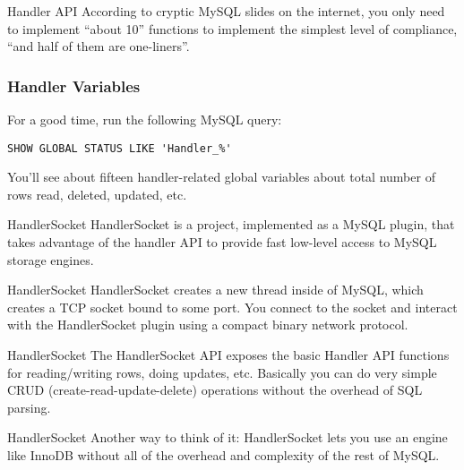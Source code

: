 \documentclass[14pt]{beamer}
\begin{document}
\begin{frame}{Handler API}
  According to cryptic MySQL slides on the internet, you only need to implement
  ``about 10'' functions to implement the simplest level of compliance, ``and
  half of them are one-liners''.
\end{frame}

\begin{frame}[fragile]
  \frametitle{Handler Variables}
  For a good time, run the following MySQL query:
\begin{verbatim}
SHOW GLOBAL STATUS LIKE 'Handler_%'
\end{verbatim}
  You'll see about fifteen handler-related global variables about total number
  of rows read, deleted, updated, etc.
\end{frame}

\begin{frame}{HandlerSocket}
  HandlerSocket is a project, implemented as a MySQL plugin, that takes
  advantage of the handler API to provide fast low-level access to MySQL storage
  engines.
\end{frame}

\begin{frame}{HandlerSocket}
  HandlerSocket creates a new thread inside of MySQL, which creates a TCP socket
  bound to some port.
  \newline
  \newline
  You connect to the socket and interact with the HandlerSocket plugin using a
  compact binary network protocol.
\end{frame}

\begin{frame}{HandlerSocket}
  The HandlerSocket API exposes the basic Handler API functions for
  reading/writing rows, doing updates, etc.
  \newline
  \newline
  Basically you can do very simple CRUD (create-read-update-delete) operations
  without the overhead of SQL parsing.
\end{frame}

\begin{frame}{HandlerSocket}
  Another way to think of it: HandlerSocket lets you use an engine like InnoDB
  without all of the overhead and complexity of the rest of MySQL.
\end{frame}
\end{document}
